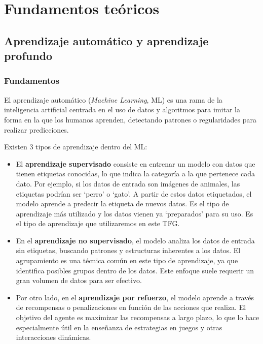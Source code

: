 \chapter{Fundamentos teóricos}
\thispagestyle{empty}

\section{Aprendizaje automático y aprendizaje profundo}

\subsection{Fundamentos}

El aprendizaje automático (\textit{Machine Learning}, ML) \cite{22,23} es una rama de la inteligencia artificial centrada en el uso de datos y algoritmos para imitar la forma en la que los humanos aprenden, detectando patrones o regularidades para realizar predicciones.

Existen 3 tipos de aprendizaje dentro del ML:

\begin{itemize}
	\item El \textbf{aprendizaje supervisado} consiste en entrenar un modelo con datos que tienen etiquetas conocidas, lo que indica la categoría a la que pertenece cada dato. Por ejemplo, si los datos de entrada son imágenes de animales, las etiquetas podrían ser \enquote*{perro} o \enquote*{gato}. A partir de estos datos etiquetados, el modelo aprende a predecir la etiqueta de nuevos datos. Es el tipo de aprendizaje más utilizado y los datos vienen ya \enquote*{preparados} para su uso. Es el tipo de aprendizaje que utilizaremos en este TFG.
	\item En el \textbf{aprendizaje no supervisado}, el modelo analiza los datos de entrada sin etiquetas, buscando patrones y estructuras inherentes a los datos. El agrupamiento es una técnica común en este tipo de aprendizaje, ya que identifica posibles grupos dentro de los datos. Este enfoque suele requerir un gran volumen de datos para ser efectivo.
	\item Por otro lado, en el \textbf{aprendizaje por refuerzo}, el modelo aprende a través de recompensas o penalizaciones en función de las acciones que realiza. El objetivo del agente es maximizar las recompensas a largo plazo, lo que lo hace especialmente útil en la enseñanza de estrategias en juegos y otras interacciones dinámicas.
\end{itemize}

